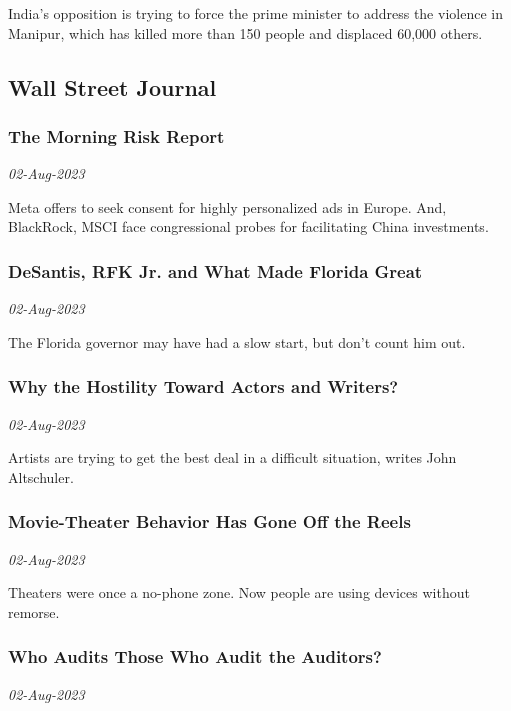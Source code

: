 India’s opposition is trying to force the prime minister to address the violence in Manipur, which has killed more than 150 people and displaced 60,000 others.
\subsection{Wall Street Journal \href{https://www.wsj.com/}{}}
\subsubsection{The Morning Risk Report \href{https://createsend.com/t/d-AD011F1000F87E702540EF23F30FEDED}{}}
\textit{02-Aug-2023}

Meta offers to seek consent for highly personalized ads in Europe. And, BlackRock, MSCI face congressional probes for facilitating China investments.
\subsubsection{DeSantis, RFK Jr. and What Made Florida Great \href{https://www.wsj.com/articles/ron-desantis-2024-election-rfk-vaccines-florida-d8f0b211}{}}
\textit{02-Aug-2023}

The Florida governor may have had a slow start, but don’t count him out.
\subsubsection{Why the Hostility Toward Actors and Writers? \href{https://www.wsj.com/articles/writers-actors-hollywood-strike-ec649064}{}}
\textit{02-Aug-2023}

Artists are trying to get the best deal in a difficult situation, writes John Altschuler.
\subsubsection{Movie-Theater Behavior Has Gone Off the Reels \href{https://www.wsj.com/articles/movie-theater-behavior-has-gone-off-the-reels-8d3ba0b}{}}
\textit{02-Aug-2023}

Theaters were once a no-phone zone. Now people are using devices without remorse.
\subsubsection{Who Audits Those Who Audit the Auditors? \href{https://www.wsj.com/articles/pcaob-audit-accounting-cost-c959d9d4}{}}
\textit{02-Aug-2023}

